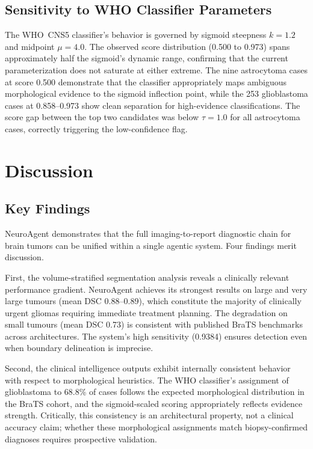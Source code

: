 \documentclass[journal]{IEEEtran}
\begin{document}
\subsection{Sensitivity to WHO Classifier Parameters}

The WHO~CNS5 classifier's behavior is governed by sigmoid steepness
$k = 1.2$ and midpoint $\mu = 4.0$. The observed score distribution
(0.500 to 0.973) spans approximately half the sigmoid's dynamic range,
confirming that the current parameterization does not saturate at either
extreme. The nine astrocytoma cases at score 0.500 demonstrate that the
classifier appropriately maps ambiguous morphological evidence to the
sigmoid inflection point, while the 253 glioblastoma cases at 0.858--0.973
show clean separation for high-evidence classifications. The score gap
between the top two candidates was below $\tau = 1.0$ for all astrocytoma
cases, correctly triggering the low-confidence flag.

\section{Discussion}

\subsection{Key Findings}

NeuroAgent demonstrates that the full imaging-to-report diagnostic chain
for brain tumors can be unified within a single agentic system. Four
findings merit discussion.

First, the volume-stratified segmentation analysis reveals a clinically
relevant performance gradient. NeuroAgent achieves its strongest results
on large and very large tumours (mean DSC 0.88--0.89), which constitute
the majority of clinically urgent gliomas requiring immediate treatment
planning. The degradation on small tumours (mean DSC 0.73) is consistent
with published BraTS benchmarks across architectures. The system's high
sensitivity (0.9384) ensures detection even when boundary delineation is
imprecise.

Second, the clinical intelligence outputs exhibit internally consistent
behavior with respect to morphological heuristics. The WHO classifier's
assignment of glioblastoma to 68.8\% of cases follows the expected
morphological distribution in the BraTS cohort, and the sigmoid-scaled
scoring appropriately reflects evidence strength. Critically, this
consistency is an architectural property, not a clinical accuracy claim;
whether these morphological assignments match biopsy-confirmed diagnoses
requires prospective validation.
\end{document}
